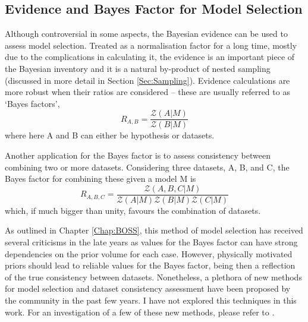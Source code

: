 \subsection{Evidence and Bayes Factor for Model Selection}
Although controversial in some aspects, the Bayesian evidence can be used to assess model selection. Treated as a normalisation factor for a long time, mostly due to the complications in calculating it, the evidence is an important piece of the Bayesian inventory and it is a natural by-product of nested sampling (discussed in more detail in Section \ref{Sec:Sampling}). Evidence calculations are more robust when their ratios are considered -- these are usually referred to as `Bayes factors',
\begin{equation}
R_{A,B} = \frac{\mathcal{Z}(A|M)}{\mathcal{Z}(B|M)}
\label{Eq:Intro:BayesFactor}
\end{equation}
where here A and B can either be hypothesis or datasets. 

\qquad Another application for the Bayes factor is to assess consistency between combining two or more datasets. Considering three datasets, A, B, and C, the Bayes factor for combining these given a model M is
\begin{equation}
R_{A,B,C} = \frac{\mathcal{Z}(A,B,C|M)}{\mathcal{Z}(A|M)\mathcal{Z}(B|M)\mathcal{Z}(C|M)}
\label{Eq:Intro:BayesFactor2}
\end{equation}
which, if much bigger than unity, favours the combination of datasets. 

\qquad As outlined in Chapter \ref{Chap:BOSS}, this method of model selection has received several criticisms in the late years as values for the Bayes factor can have strong dependencies on the prior volume for each case. However, physically motivated priors should lead to reliable values for the Bayes factor, being then a reflection of the true consistency between datasets. Nonetheless, a plethora of new methods for model selection and dataset consistency assessment have been proposed by the community in the past few years. I have not explored this techniques in this work. For an investigation of a few of these new methods, please refer to \cite{2017CharnockTension,2018HuTension,2018FeeneyTension}.

